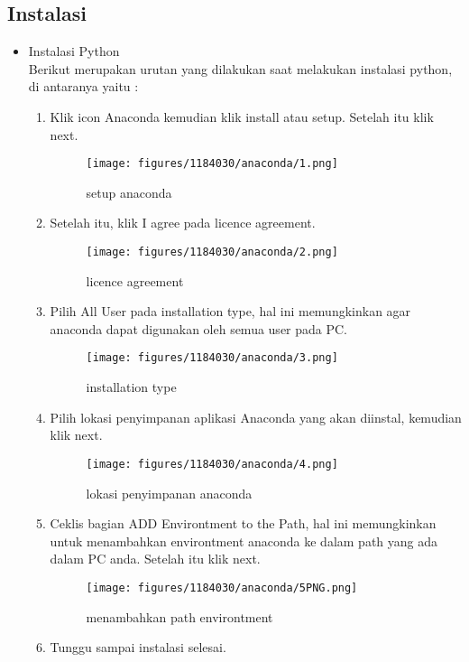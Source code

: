 \begin{enumerate}
\section{Instalasi}
\begin{itemize}
	\item Instalasi Python\\
	Berikut merupakan urutan yang dilakukan saat melakukan instalasi python, di antaranya yaitu :\\
	\begin{enumerate}
		\item Klik icon Anaconda kemudian klik install atau setup. Setelah itu klik next.
		\begin{figure}[H]
			\texttt{[image: figures/1184030/anaconda/1.png]}
			\centering
			\caption{setup anaconda}
			\end{figure}
		\item Setelah itu, klik I agree pada licence agreement.\\
			\begin{figure}[H]
			\texttt{[image: figures/1184030/anaconda/2.png]}
			\centering
			\caption{licence agreement}
			\end{figure}
		\item Pilih All User pada installation type, hal ini memungkinkan agar anaconda dapat digunakan oleh semua user pada PC.\\
			\begin{figure}[H]
			\texttt{[image: figures/1184030/anaconda/3.png]}
			\centering
			\caption{installation type}
			\end{figure}
		\item Pilih lokasi penyimpanan aplikasi Anaconda yang akan diinstal, kemudian klik next.\\
			\begin{figure}[H]
			\texttt{[image: figures/1184030/anaconda/4.png]}
			\centering
			\caption{lokasi penyimpanan anaconda}
			\end{figure}
		\item Ceklis bagian ADD Environtment to the Path, hal ini memungkinkan untuk menambahkan environtment anaconda ke dalam path yang ada dalam PC anda. Setelah itu klik next.
			\begin{figure}[H]
			\texttt{[image: figures/1184030/anaconda/5PNG.png]}
			\centering
			\caption{menambahkan path environtment}
			\end{figure}
		\item Tunggu sampai instalasi selesai.

\end{enumerate}
\end{itemize}
\end{enumerate}
